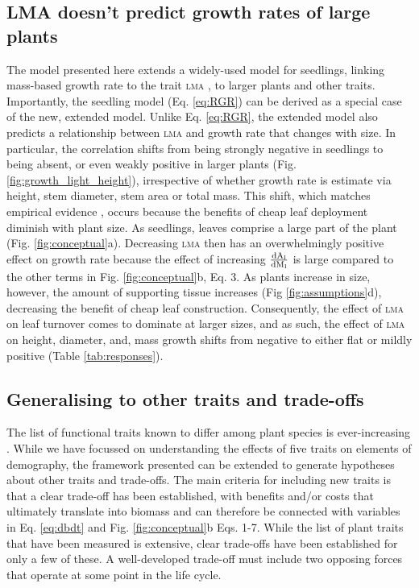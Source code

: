 \documentclass[9pt,twocolumn,twoside,lineno]{pnas-new}
\newcommand{\ud}{\ensuremath{\rm{d}}}
\newcommand{\lma}{\textsc{lma}}
\begin{document}
\subsection*{LMA doesn't predict growth rates of large plants}

The model presented here extends a widely-used model for seedlings, linking mass-based growth rate to the trait {\lma} \citep{Lambers-1992, Wright-2000}, to larger plants and other traits. Importantly, the seedling model (Eq. \ref{eq:RGR}) can be derived as a special case of the new, extended model. Unlike Eq. \ref{eq:RGR}, the extended model also predicts a relationship between {\lma} and growth rate that changes with size. In particular, the correlation shifts from being strongly negative in seedlings to being absent, or even weakly positive in larger plants (Fig. \ref{fig:growth_light_height}), irrespective of whether growth rate is estimate via height, stem diameter, stem area or total mass. This shift, which matches empirical evidence \citep{Poorter-2008, Wright-2010, Herault-2011, Paine-2015, Gibert-2016}, occurs because the benefits of cheap leaf deployment diminish with plant size. As seedlings, leaves comprise a large part of the plant (Fig. \ref{fig:conceptual}a). Decreasing {\lma} then has an overwhelmingly positive effect on growth rate because the effect of increasing $\frac{\ud A_{\rm l}}{\ud M_{\rm l}}$ is large compared to the other terms in Fig. \ref{fig:conceptual}b, Eq. {\color{pnasbluetext}3}. As plants increase in size, however, the amount of supporting tissue increases (Fig \ref{fig:assumptions}d), decreasing the benefit of cheap leaf construction. Consequently, the effect of {\lma} on leaf turnover comes to dominate at larger sizes, and as such, the effect of {\lma} on height, diameter, and, mass growth shifts from negative to either flat or mildly positive  (Table \ref{tab:responses}).


\subsection*{Generalising to other traits and trade-offs}

The list of functional traits known to differ among plant species is ever-increasing \citep{Perez-2013}. While we have focussed on understanding the effects of five traits on elements of demography, the framework presented can be extended to generate hypotheses about other traits and trade-offs. The main criteria for including new traits is that a clear trade-off has been established, with benefits and/or costs that ultimately translate into biomass and can therefore be connected with variables in Eq. \ref{eq:dbdt} and Fig. \ref{fig:conceptual}b Eqs. {\color{pnasbluetext}1}-{\color{pnasbluetext}7}. While the list of plant traits that have been measured is extensive, clear trade-offs have been established for only a few of these. A well-developed trade-off must include two opposing forces that operate at some point in the life cycle.
\end{document}
